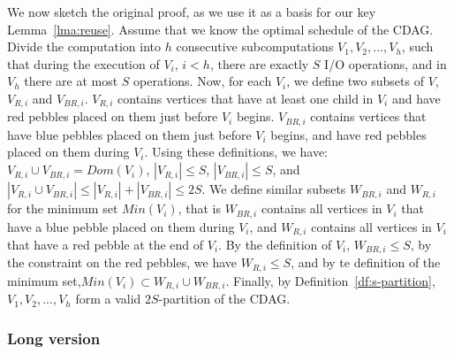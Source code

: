 \documentclass[sigplan,review,anonymous]{acmart}\settopmatter{printfolios=true,printccs=false,printacmref=false}
\newcommand\greg[1]{\textcolor{blue}{[Greg: #1]}}
\begin{document}
We now sketch the original proof, as we use it as a basis for our key 
Lemma~\ref{lma:reuse}.
Assume that we know the optimal schedule of the CDAG. Divide the computation
into $h$ consecutive subcomputations $V_1, V_2, ..., V_h$, such that during the
execution of $V_i$, $i < h$, there are exactly $S$ I/O operations, and in $V_h$
there are at most $S$ operations. Now, for each $V_i$, we define two subsets of
$V$, $V_{R,i}$ and $V_{BR,i}$.
%
%
$V_{R,i}$ contains vertices that have at least one child in $V_i$ and have red 
pebbles placed on them just before
$V_i$ begins.
%
$V_{BR,i}$ contains vertices that have blue pebbles placed on them just before
$V_i$ begins, and have red pebbles placed on them during $V_i$.
%
%
%
%
Using these definitions, we have:  $V_{R,i} \cup V_{BR,i} =
Dom(V_i)$,  $|V_{R,i}| \le S$,  $|V_{BR,i}| \le S$, and
 $|V_{R,i} \cup V_{BR,i}| \le |V_{R,i}| + |V_{BR,i}| \le 2S$.
% 
% 
We define similar subsets $W_{BR,i}$ and $W_{R,i}$ for the minimum set 
$Min(V_i)$, that is $W_{BR,i}$ contains all vertices in $V_i$ that have a blue 
pebble placed on them during $V_i$, and  $W_{R,i}$ contains all vertices in 
$V_i$ that have a red pebble at the end of $V_i$. By the definition of $V_i$, 
$W_{BR,i} \le S$, by the constraint on the red pebbles, we have $W_{R,i} \le 
S$, and by te definition of the minimum set,$Min(V_i) \subset W_{R,i} \cup 
W_{BR,i}$.
%
Finally, by Definition~\ref{df:s-partition}, $V_1, V_2, ..., V_h$ form a valid
$2S$-partition of the CDAG. 

\subsubsection{Long version}
%
\end{document}
